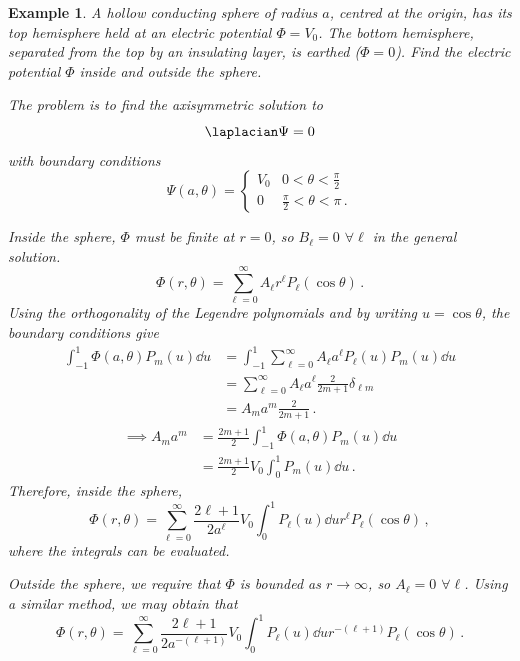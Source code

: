 \documentclass{article}
\theoremstyle{plain}\theoremheaderfont{\normalfont\itshape}\theorembodyfont{\rmfamily}\theoremseparator{.}\newtheorem*{rem}{Remark}\newtheorem*{ex}{Example}\newtheorem*{proof}{Proof}\newtheorem*{altp}{Alternative proof}
\theoremstyle{plain}\theoremheaderfont{\normalfont\bfseries}\theorembodyfont{\rmfamily}\theoremseparator{.}\newtheorem{thm}{Theorem}[section]\newtheorem{lem}[thm]{Lemma}\newtheorem{prop}[thm]{Proposition}\newtheorem*{cor}{Corollary}\newtheorem{defn}[thm]{Definition}\newtheorem{clm}[thm]{Claim}\newtheorem{clminproof}{Claim}
\theoremstyle{break}\theoremheaderfont{\normalfont\itshape}\theorembodyfont{\rmfamily}\theoremseparator{.\medskip}\newtheorem*{proofskip}{Proof}\newtheorem*{exs}{Examples}\newtheorem*{rems}{Remarks}
\theoremstyle{break}\theoremheaderfont{\normalfont\bfseries}\theorembodyfont{\rmfamily}\theoremseparator{.\medskip}\newtheorem{lemskip}[thm]{Lemma}\newtheorem{defnskip}[thm]{Definition}\newtheorem{propskip}[thm]{Proposition}\newtheorem{thmskip}[thm]{Theorem}
\numberwithin{equation}{section}
\begin{document}
	\begin{ex}
		A hollow conducting sphere of radius \(a\), centred at the origin, has its top hemisphere held at an electric potential \(\Phi=V_0\). The bottom hemisphere, separated from the top by an insulating layer, is earthed (\(\Phi=0\)). Find the electric potential \(\Phi\) inside and outside the sphere.
		
		The problem is to find the axisymmetric solution to
		\[\laplacian\Psi=0\]
		with boundary conditions
		\[\Psi(a,\theta)=\begin{cases}
			V_0 & 0<\theta<\frac{\pi}{2}\\
			0 & \frac{\pi}{2}<\theta<\pi\,.
		\end{cases}\]

		Inside the sphere, \(\Phi\) must be finite at \(r=0\), so \(B_\ell=0\) \(\forall \ell\) in the general solution.
		\[\Phi(r,\theta)=\sum_{\ell=0}^{\infty}A_\ell r^\ell P_\ell(\cos\theta)\,.\]
		Using the orthogonality of the Legendre polynomials and by writing \(u=\cos\theta\), the boundary conditions give
		\begin{align*}
			\int_{-1}^{1}\Phi(a,\theta)P_m(u)\dd{u}&=\int_{-1}^{1}\sum_{\ell=0}^{\infty}A_\ell a^\ell P_\ell(u)P_m(u)\dd{u}\\
			&=\sum_{\ell=0}^{\infty}A_\ell a^\ell\frac{2}{2m+1}\delta_{\ell m}\\
			&=A_ma^m\frac{2}{2m+1}\,.
		\end{align*}
		\begin{align*}
			\implies A_ma^m&=\frac{2m+1}{2}\int_{-1}^{1}\Phi(a,\theta)P_m(u)\dd{u}\\
			&=\frac{2m+1}{2}V_0\int_{0}^{1}P_m(u)\dd{u}\,.
		\end{align*}
		Therefore, inside the sphere,
		\[\Phi(r,\theta)=\sum_{\ell=0}^{\infty}\frac{2\ell+1}{2a^\ell}V_0\int_{0}^{1}P_\ell(u)\dd{u} r^\ell P_\ell(\cos\theta)\,,\]
		where the integrals can be evaluated.

		Outside the sphere, we require that \(\Phi\) is bounded as \(r\to\infty\), so \(A_\ell=0\) \(\forall\ell\). Using a similar method, we may obtain that
		\[\Phi(r,\theta)=\sum_{\ell=0}^{\infty}\frac{2\ell+1}{2a^{-(\ell+1)}}V_0\int_{0}^{1}P_\ell(u)\dd{u} r^{-(\ell+1)}P_\ell(\cos\theta)\,.\]
	\end{ex}
\end{document}
